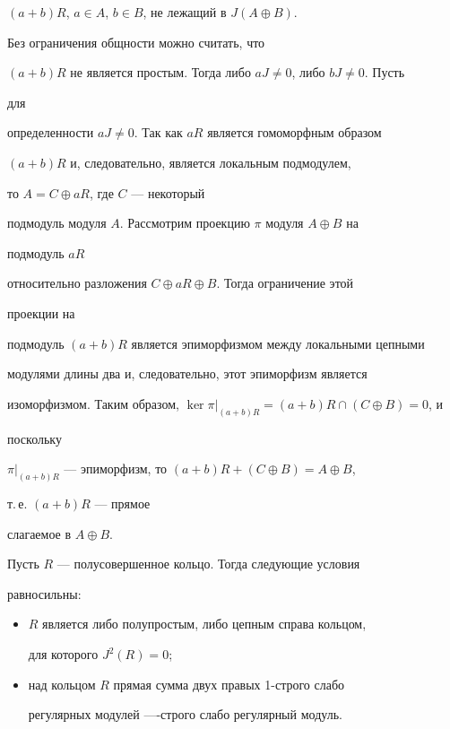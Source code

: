 $(a+b)R$, $a\in A$, $b\in B$, не лежащий в $J(A\oplus B)$.


Без ограничения общности можно считать, что 


$(a+b)R$ не является простым. Тогда либо $aJ\ne0$, либо $bJ\ne0$. Пусть 


для 


определенности $aJ\ne0$. Так как $aR$ является гомоморфным образом 


$(a+b)R$ и, следовательно, является локальным подмодулем,


то $A=C\oplus aR$, где $C$ --- некоторый 


подмодуль модуля $A$. Рассмотрим проекцию $\pi$ модуля $A\oplus B$ на 


подмодуль $aR$ 


относительно разложения $C\oplus aR\oplus B$. Тогда ограничение этой 


проекции на 


подмодуль $(a+b)R$ является эпиморфизмом между локальными цепными 


модулями длины два и, следовательно, этот эпиморфизм является 


изоморфизмом. Таким образом, $\ker\pi|_{(a+b)R}=(a+b)R\cap(C\oplus B)=0$, и 


поскольку 


$\pi|_{(a+b)R}$ --- эпиморфизм, то $(a+b)R+(C\oplus B)=A\oplus B$, 


т.\,е. $(a+b)R$ --- прямое 


слагаемое в $A\oplus B$. 


 


\begin{cor} 


Пусть $R$ --- полусовершенное кольцо. Тогда следующие условия 


равносильны: 


\begin{itemize} 


\item[1)] $R$ является либо полупростым, либо цепным справа кольцом, 


для которого $J^2(R)=0$; 


\item[2)] над кольцом $R$ прямая сумма двух правых 1-строго слабо 


регулярных модулей ----строго слабо регулярный модуль. 


\end{itemize} 


\end{cor} 



